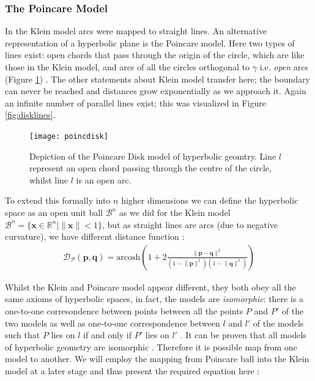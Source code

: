 \documentclass[12pt]{report}
\begin{document}
\subsubsection{The Poincare Model}
In the Klein model arcs were mapped to straight lines. An alternative representation of a hyperbolic plane is the Poincare model. Here two types of lines exist: open chords that pass through the origin of the circle, which are like those in the Klein model, and arcs of all the circles orthogonal to $\gamma$ i.e. \textit{open} arcs (Figure \ref{fig:pdisk}) \cite{Greenberg1994}. The other statements about Klein model transfer here; the boundary can never be reached and distances grow exponentially as we approach it. Again an infinite number of parallel lines exist; this was visualized in Figure \ref{fig:disklines}.

\begin{figure}
  \centering
	\texttt{[image: poincdisk]}
	\caption{Depiction of the Poincare Disk model of hyperbolic geomtry. Line $l$ represent an open chord passing through the centre of the circle, whilst line $l$ is an open arc.
}
	\label{fig:pdisk}
\end{figure}

To extend this formally into $n$ higher dimensions we can define the hyperbolic space as an open unit ball $\mathcal{B}^n$ as we did for the Klein model $\mathcal{B}^n = \{\mathbf{x} \in \mathbb{R}^n | \lVert \mathbf{x} \rVert <1 \}$, but as straight lines are arcs (due to negative curvature), we have different distance function \cite{Iversen1992}:
\begin{align}
  \mathcal{D_P}(\mathbf{p}, \mathbf{q}) = \text{arcosh} \left(1 + 2 \frac{\lVert \mathbf{p} - \mathbf{q} \rVert^2}{(1-\lVert \mathbf{p}\rVert^2)(1-\lVert \mathbf{q}\rVert^2)}   \right) 
\end{align}

Whilst the Klein and Poincare model appear different, they both obey all the same axioms of hyperbolic spaces, in fact, the models are \textit{isomorphic}: there is a one-to-one corresondence between points between all the points $P$ and $P'$ of the two models as well as one-to-one correspondence between $l$ and $l'$ of the models such that $P$ lies on $l$ if and only if $P'$ lies on $l'$ \cite{Greenberg1994}. It can be proven that all models of hyperbolic geometry are isomorphic \cite{Greenberg1994}. Therefore it is possible map from one model to another. We will employ the mapping from Poincare ball into the Klein model at a later stage and thus present the required equation here \cite{Greenberg1994}:
\end{document}
